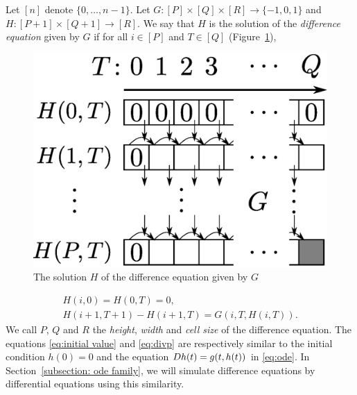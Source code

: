 Let $[n]$ denote $\{0, \dots , n-1\}$.
Let $G \colon [P] \times [Q] \times [R] \to \{-1, 0, 1\}$ and
$H \colon [P + 1] \times [Q+1] \to [R]$. 
We say that $H$ is the solution of the \emph{difference equation} given by $G$
if for all $i \in [P]$ and $T \in [Q]$ (Figure~\ref{fig:divp}), 
\begin{figure}[tb]
 \begin{center}
  \includegraphics[height=0.15\textheight]{image/divp.eps}
 \end{center}
 \caption{The solution $H$ of the difference equation given by $G$}
 \label{fig:divp}
\end{figure}
\begin{gather}
   H(i, 0) = H(0, T) = 0, \label{eq:initial value}
\\
   H(i + 1, T + 1) - H(i+1, T) = G(i, T, H(i, T)).  \label{eq:divp}
\end{gather}
We call $P$, $Q$ and $R$ the \emph{height}, \emph{width} and \emph{cell size} of
the difference equation.
The equations \eqref{eq:initial value} and \eqref{eq:divp} are respectively similar to 
the initial condition $h(0) = 0$ and the equation $D h(t) = g(t, h(t))$ 
in \eqref{eq:ode}.
In Section~\ref{subsection: ode family}, we will simulate difference equations by differential equations using this similarity.

